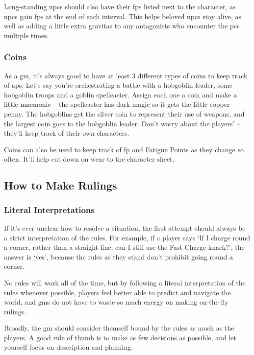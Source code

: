 \begin{multicols}{2}
Long-standing \glspl{npc} should also have their \glspl{fp} listed next to the character, as \glspl{npc} gain \glspl{fp} at the end of each \gls{interval}.
This helps beloved \glspl{npc} stay alive, as well as adding a little extra gravitas to any antagonists who encounter the \glspl{pc} multiple times.

\subsubsection{Coins}

As a \gls{gm}, it's always good to have at least 3 different types of coins to keep track of \glspl{ap}.
Let's say you're orchestrating a battle with a hobgoblin leader, some hobgoblin troops and a goblin spellcaster.
Assign each one a coin and make a little mnemonic -- the spellcaster has dark magic so it gets the little copper penny.
The hobgoblins get the silver coin to represent their use of weapons, and the largest coin goes to the hobgoblin leader.
Don't worry about the players'  -- they'll keep track of their own characters.

Coins can also be used to keep track of \gls{fp} and Fatigue Points as they change so often.
It'll help cut down on wear to the character sheet.

\subsection{How to Make Rulings}

\subsubsection{Literal Interpretations}

If it's ever unclear how to resolve a situation, the first attempt should always be a strict interpretation of the rules.
For example, if a player says `If I charge round a corner, rather than a straight line, can I still use the Fast Charge knack?', the answer is `yes', because the rules as they stand don't prohibit going round a corner.

No rules will work all of the time, but by following a literal interpretation of the rules whenever possible, players feel better able to predict and navigate the world, and \glspl{gm} do not have to waste so much energy on making on-the-fly rulings.

Broadly, the \gls{gm} should consider themself bound by the rules as much as the players.
A good rule of thumb is to make as few decisions as possible, and let yourself focus on description and planning.


\end{multicols}
